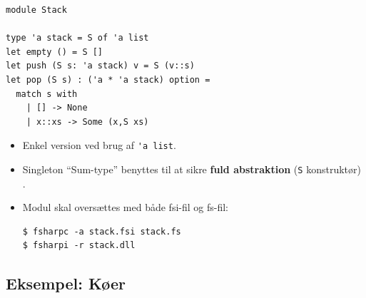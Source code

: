 \documentclass[rgb]{beamer}
\begin{document}
\begin{frame}[fragile]
\begin{footnotesize}


  \vspace{1ex}


\begin{lstlisting}[numbers=none,frame=none,mathescape]
module Stack

type 'a stack = S of 'a list
let empty () = S []
let push (S s: 'a stack) v = S (v::s)
let pop (S s) : ('a * 'a stack) option =
  match s with
    | [] -> None
    | x::xs -> Some (x,S xs)
\end{lstlisting}

  \vspace{1ex}
\begin{itemize}
\item Enkel version ved brug af \lstinline{'a list}.
\item Singleton ``Sum-type'' benyttes til at sikre \textbf{fuld abstraktion} (\lstinline{S} konstruktør) .
\item Modul skal oversættes med både fsi-fil og fs-fil:
\begin{verbatim}
$ fsharpc -a stack.fsi stack.fs
$ fsharpi -r stack.dll
\end{verbatim}
\end{itemize}

\end{footnotesize}
\end{frame}

\subsection{Eksempel: Køer}
\end{document}
